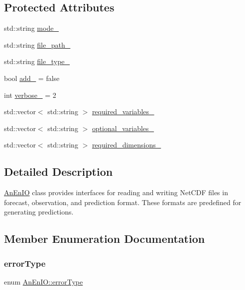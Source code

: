 \subsection*{Protected Attributes}
\begin{DoxyCompactItemize}
\item 
std\+::string \mbox{\hyperlink{class_an_en_i_o_a311891a4a1a6b3907246da853bc4e5c8}{mode\+\_\+}}
\item 
std\+::string \mbox{\hyperlink{class_an_en_i_o_ab892e06ca18be5e0c442c9e882e4475f}{file\+\_\+path\+\_\+}}
\item 
std\+::string \mbox{\hyperlink{class_an_en_i_o_addbfb455f641a394c14907163874d8fe}{file\+\_\+type\+\_\+}}
\item 
bool \mbox{\hyperlink{class_an_en_i_o_af41950dbc4fabfba3d00263c297b50ad}{add\+\_\+}} = false
\item 
int \mbox{\hyperlink{class_an_en_i_o_a4f6abd007730e4a8f54d57cc3572bd9e}{verbose\+\_\+}} = 2
\item 
std\+::vector$<$ std\+::string $>$ \mbox{\hyperlink{class_an_en_i_o_a119dcb81d3811547f0e37d6c3752f0a7}{required\+\_\+variables\+\_\+}}
\item 
std\+::vector$<$ std\+::string $>$ \mbox{\hyperlink{class_an_en_i_o_a43f82ffbafbbda7ab8c9471d0bce70df}{optional\+\_\+variables\+\_\+}}
\item 
std\+::vector$<$ std\+::string $>$ \mbox{\hyperlink{class_an_en_i_o_adf42061631c78508bde00de7d22a65b4}{required\+\_\+dimensions\+\_\+}}
\end{DoxyCompactItemize}


\subsection{Detailed Description}
\mbox{\hyperlink{class_an_en_i_o}{An\+En\+IO}} class provides interfaces for reading and writing Net\+C\+DF files in forecast, observation, and prediction format. These formats are predefined for generating predictions. 

\subsection{Member Enumeration Documentation}
\mbox{\label{class_an_en_i_o_aa56bc1ec6610b86db4349bce20f9ead0}} 
\subsubsection{\texorpdfstring{error\+Type}{errorType}}
{\footnotesize\ttfamily enum \mbox{\hyperlink{class_an_en_i_o_aa56bc1ec6610b86db4349bce20f9ead0}{An\+En\+I\+O\+::error\+Type}}}

